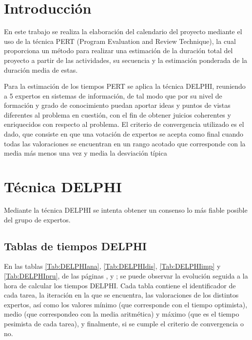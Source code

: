 \documentclass[11pt,a4paper,spanish,twoside]{report}
\begin{document}
\tableofcontents
\listoftables
\listoffigures


\chapter*{Introducción}
En este trabajo se realiza la elaboración del calendario del proyecto
mediante el uso de la técnica PERT (Program Evaluation and Review Technique),
la cual proporciona un método para realizar una estimación de la duración
total del proyecto a partir de las actividades, su secuencia y la estimación
ponderada de la duración media de estas. 

Para la estimación de los tiempos PERT se aplica la técnica DELPHI, reuniendo
a 5 expertos en sistemas de información, de tal modo que por su nivel de
formación y grado de 
conocimiento puedan aportar ideas y puntos de vistas diferentes al problema
en cuestión, con el fin de obtener juicios coherentes y enriquecidos con
respecto al problema. El criterio de convergencia utilizado es el dado, que
consiste en que una votación de expertos se acepta como final cuando todas
las valoraciones se encuentran en un rango acotado que corresponde
con la media más menos una vez y media la desviación típica

\chapter{Técnica DELPHI}
Mediante la técnica DELPHI se intenta obtener un consenso lo más fiable
posible del grupo de expertos.
    
\section{Tablas de tiempos DELPHI}
En las tablas \ref{Tab:DELPHIana}, \ref{Tab:DELPHIdis}, \ref{Tab:DELPHIimp} y
\ref{Tab:DELPHIpru}, de las páginas \pageref{Tab:DELPHIana},
\pageref{Tab:DELPHIdis} y \pageref{Tab:DELPHIimp}; se
puede observar la evolución seguida a la hora de calcular los tiempos
DELPHI. Cada tabla contiene el identificador de cada tarea, la iteración en
la que se encuentra, las valoraciones de los distintos expertos, así como los
valores mínimo (que corresponde con el tiempo optimista), medio (que
correspondeo con la media aritmética) y máximo (que es el tiempo pesimista de
cada tarea), y finalmente, si se cumple el criterio de convergencia o no.
\end{document}
